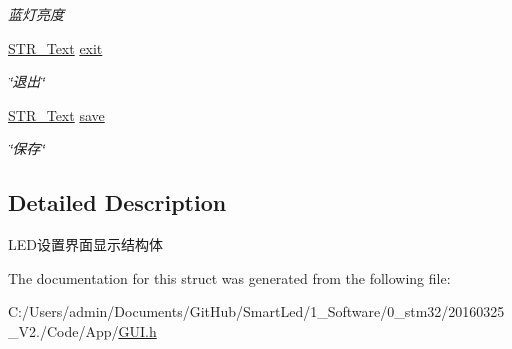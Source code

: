 \begin{DoxyCompactItemize}
\begin{DoxyCompactList}\small\item\em 蓝灯亮度 \end{DoxyCompactList}\item 
\hypertarget{struct_s_t_r___led_set_a767aee104b7cfaa75da1d111a915f5ca}{\hyperlink{struct_s_t_r___text}{\-S\-T\-R\-\_\-\-Text} \hyperlink{struct_s_t_r___led_set_a767aee104b7cfaa75da1d111a915f5ca}{exit}}\label{struct_s_t_r___led_set_a767aee104b7cfaa75da1d111a915f5ca}

\begin{DoxyCompactList}\small\item\em \char`\"{}退出\char`\"{} \end{DoxyCompactList}\item 
\hypertarget{struct_s_t_r___led_set_a2c0fa7db976a16aec9eeaa9abb4bd987}{\hyperlink{struct_s_t_r___text}{\-S\-T\-R\-\_\-\-Text} \hyperlink{struct_s_t_r___led_set_a2c0fa7db976a16aec9eeaa9abb4bd987}{save}}\label{struct_s_t_r___led_set_a2c0fa7db976a16aec9eeaa9abb4bd987}

\begin{DoxyCompactList}\small\item\em \char`\"{}保存\char`\"{} \end{DoxyCompactList}\end{DoxyCompactItemize}


\subsection{\-Detailed \-Description}
\-L\-E\-D设置界面显示结构体 

\-The documentation for this struct was generated from the following file\-:\begin{DoxyCompactItemize}
\item 
\-C\-:/\-Users/admin/\-Documents/\-Git\-Hub/\-Smart\-Led/1\-\_\-\-Software/0\-\_\-stm32/20160325\-\_\-\-V2./\-Code/\-App/\hyperlink{_g_u_i_8h}{\-G\-U\-I.\-h}\end{DoxyCompactItemize}
